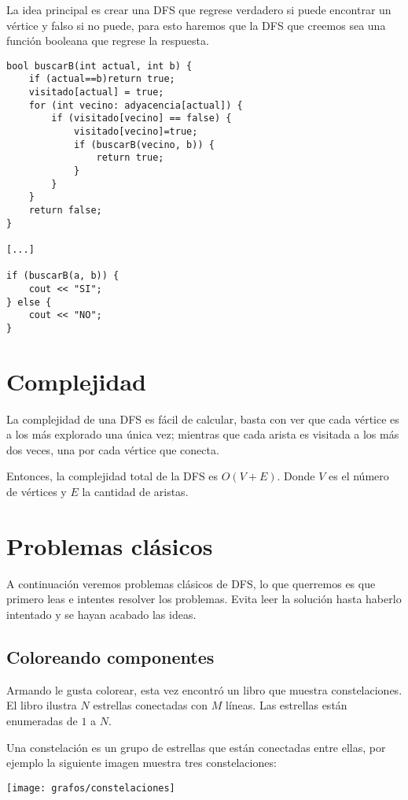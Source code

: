 La idea principal es crear una DFS que regrese verdadero si puede encontrar un vértice y falso si no puede, para esto haremos que la DFS que creemos sea una función booleana que regrese la respuesta.

\begin{minipage}{\linewidth}
\begin{lstlisting}
bool buscarB(int actual, int b) {
	if (actual==b)return true;
	visitado[actual] = true;
	for (int vecino: adyacencia[actual]) {
		if (visitado[vecino] == false) {
			visitado[vecino]=true;
			if (buscarB(vecino, b)) {
				return true;
			}
		}
	}
	return false;
}

[...]

if (buscarB(a, b)) {
	cout << "SI";
} else {
	cout << "NO";
}
\end{lstlisting}
\end{minipage}

\section{Complejidad}
La complejidad de una DFS es fácil de calcular, basta con ver que cada vértice es a los más explorado una única vez; mientras que cada arista es visitada a los más dos veces, una por cada vértice que conecta.

Entonces, la complejidad total de la DFS es \(O(V+E)\). Donde \(V\) es el número de vértices y \(E\) la cantidad de aristas.

\section{Problemas clásicos}
A continuación veremos problemas clásicos de DFS, lo que querremos es que primero leas e intentes resolver los problemas. Evita leer la solución hasta haberlo intentado y se hayan acabado las ideas.

\subsection{Coloreando componentes}
Armando le gusta colorear, esta vez encontró un libro que muestra constelaciones.
El libro ilustra \(N\) estrellas conectadas con \(M\) líneas. Las estrellas están enumeradas de \(1\) a \(N\).

Una constelación es un grupo de estrellas que están conectadas entre ellas, por ejemplo la siguiente imagen muestra tres constelaciones:

\begin{center}
	\texttt{[image: grafos/constelaciones]}
\end{center}


